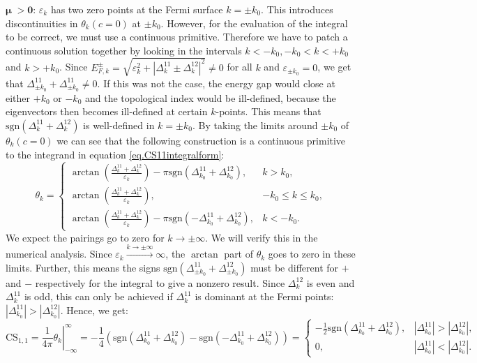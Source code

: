 $\boldsymbol\mu \; \mathbf{> 0}$: $\varepsilon_k$ has two zero points at the Fermi surface $k = \pm k_0$. This introduces discontinuities in $\theta_k(c = 0)$ at $\pm k_0$. However, for the evaluation of the integral to be correct, we must use a continuous primitive. Therefore we have to patch a continuous solution together by looking in the intervals $k < -k_0, -k_0 < k < +k_0$ and $k > +k_0$. Since $E^{\pm}_{F,k} = \sqrt{\varepsilon^2_k + |\Delta^{11}_k \pm \Delta^{12}_k|^2} \neq 0$ for all $k$ and $\varepsilon_{\pm k_0} = 0$, we get that $\Delta^{11}_{\pm k_0} + \Delta^{11}_{\pm k_0} \neq 0$. If this was not the case, the energy gap would close at either $+k_0$ or $-k_0$ and the topological index would be ill-defined, because the eigenvectors then becomes ill-defined at certain $k$-points. This means that $\text{sgn}(\Delta^{11}_k + \Delta^{12}_k)$ is well-defined in $k = \pm k_0$. By taking the limits around $\pm k_0$ of $\theta_k(c = 0)$ we can see that the following construction is a continuous primitive to the integrand in equation \eqref{eq.CS11integralform}:
\begin{equation}
\theta_k = \left\{ \begin{matrix} 
\arctan\left(\frac{\Delta^{11}_k + \Delta^{12}_k }{\varepsilon_k}\right) - \pi\text{sgn}(\Delta^{11}_{k_0} + \Delta^{12}_{k_0}), & k > k_0, \\
\arctan\left(\frac{\Delta^{11}_k + \Delta^{12}_k }{\varepsilon_k}\right), & -k_0 \leq k \leq k_0, \\
\arctan\left(\frac{\Delta^{11}_k + \Delta^{12}_k }{\varepsilon_k}\right) - \pi \text{sgn}(-\Delta^{11}_{k_0} + \Delta^{12}_{k_0}), & k < -k_0.
  \end{matrix} \right.
\label{eq.2wires.Gkmugreater0}
\end{equation}
We expect the pairings go to zero for $k\to \pm \infty$. We will verify this in the numerical analysis. Since $\varepsilon_k \overset{k\to \pm \infty}{\to} \infty$, the $\arctan$ part of $\theta_k$ goes to zero in these limits. Further, this means the signs $\text{sgn}(\Delta^{11}_{\pm k_0} + \Delta^{12}_{\pm k_0})$ must be different for $+$ and $-$ respectively for the integral to give a nonzero result. Since $\Delta^{12}_{k}$ is even and $\Delta^{11}_{k}$ is odd, this can only be achieved if $\Delta^{11}_{k}$ is dominant at the Fermi points: $|\Delta^{11}_{k_0}| > |\Delta^{12}_{k_0}|$. Hence, we get:
\begin{equation}
\text{CS}_{1,1} = \left. \frac{1}{4\pi} \theta_k \right|^\infty_{-\infty} = -\frac{1}{4}(\text{sgn}(\Delta^{11}_{k_0} + \Delta^{12}_{k_0}) - \text{sgn}(-\Delta^{11}_{k_0} + \Delta^{12}_{k_0})) = \left\{ \begin{matrix} 
-\frac{1}{2}\text{sgn}(\Delta^{11}_{k_0} + \Delta^{12}_{k_0}) , & |\Delta^{11}_{k_0}| > |\Delta^{12}_{k_0}|, \\
0, & |\Delta^{11}_{k_0}| < |\Delta^{12}_{k_0}|.
  \end{matrix} \right. \nonumber 
\end{equation}
